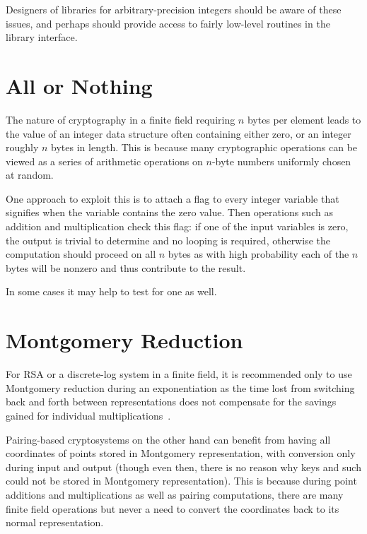 Designers of libraries for arbitrary-precision integers should be aware of
these issues, and perhaps should provide access to fairly low-level
routines in the library interface.

\section{All or Nothing}

The nature of cryptography in a finite field requiring $n$ bytes per element
leads to the value of an integer data structure
often containing either zero, or an integer roughly $n$ bytes in length.
This is because many cryptographic operations can be viewed as a series of
arithmetic operations on $n$-byte numbers uniformly chosen at random.

One approach to exploit this is to attach a flag to every integer variable
that signifies when the variable contains the zero value. Then operations
such as addition and multiplication check this flag: if one of the input
variables is zero, the output is trivial to determine and no looping
is required, otherwise the computation should proceed on all $n$ bytes as
with high probability each of the $n$ bytes will be nonzero and thus
contribute to the result.

In some cases it may help to test for one as well.


\section{Montgomery Reduction}

For RSA or a discrete-log system in a finite field, it is recommended
only to use Montgomery reduction during an exponentiation
as the time lost from switching back and forth between representations
does not compensate for the savings gained for individual multiplications~\cite{handbook}.

Pairing-based cryptosystems on the other hand can benefit from having
all coordinates of points stored in Montgomery representation, with conversion
only during input and output (though even then, there is no reason why keys
and such could not be stored in Montgomery representation). This is because
during point additions and multiplications as well as pairing computations,
there are many finite field operations but never a need to convert the
coordinates back to its normal representation.

